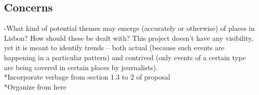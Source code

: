 \subsection{Concerns}
-{\color{purple}What kind of potential themes may emerge (accurately or otherwise) of places in Lisbon? How should these be dealt with? This project doesn’t have any visibility, yet it is meant to identify trends -- both actual (because such events are happening in  a particular pattern) and contrived (only events of a certain type are being covered in certain places by journalists).\cite{McQueenBaker2019}}\\

{\color{red} 
*Incorporate verbage from section 1.3 to 2 of proposal\\
*Organize from here\\
}






